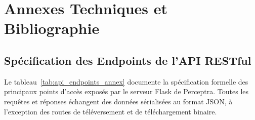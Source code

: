 \chapter{Annexes Techniques et Bibliographie}
\label{chap:annexes}

\section{Spécification des Endpoints de l'API RESTful}

Le tableau~\ref{tab:api_endpoints_annex} documente la spécification formelle des principaux points d'accès exposés par le serveur Flask de Perceptra. Toutes les requêtes et réponses échangent des données sérialisées au format JSON, à l'exception des routes de téléversement et de téléchargement binaire.

